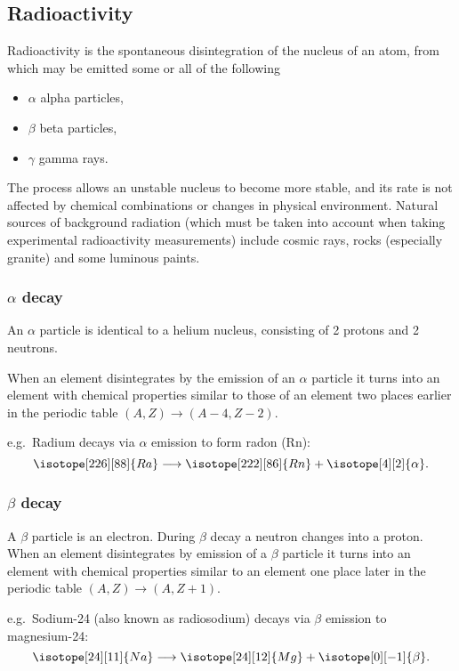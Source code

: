 \documentclass[a4paper,12pt]{article}
\begin{document}
\subsection{Radioactivity}

Radioactivity is the spontaneous disintegration of the nucleus of an atom, from which may be emitted some or all of the following
\begin{itemize}
\item $\alpha$ alpha particles,
\item $\beta$ beta particles,
\item $\gamma$ gamma rays.
\end{itemize}

The process allows an unstable nucleus to become more stable, and its rate is not affected by chemical combinations or changes in physical environment.  Natural sources of background radiation (which must be taken into account when taking experimental radioactivity measurements) include cosmic rays, rocks (especially granite) and some luminous paints.

\subsubsection{$\alpha$ decay}
An $\alpha$ particle is identical to a helium nucleus, consisting of 2 protons and 2 neutrons.

When an element disintegrates by the emission of an $\alpha$ particle it turns into an element with chemical properties similar to those of an element two places earlier in the periodic table $(A,Z)\rightarrow(A-4,Z-2)$.

e.g.\ Radium  decays via $\alpha$ emission to form radon (Rn):
\[\isotope[226][88]{Ra}\longrightarrow\isotope[222][86]{Rn}+\isotope[4][2]{\alpha}.\]

\subsubsection{$\beta$ decay}
A $\beta$ particle is an electron. During $\beta$ decay a neutron changes into a proton.  When an element disintegrates by emission of a $\beta$ particle it turns into an element with chemical properties similar to an element one place later in the periodic table $(A,Z)\rightarrow(A,Z+1)$. 

e.g.\  Sodium-24 (also known as radiosodium) decays via $\beta$ emission to magnesium-24:
\[\isotope[24][11]{Na}\longrightarrow\isotope[24][12]{Mg}+\isotope[0][-1]{\beta}.\]
\end{document}
